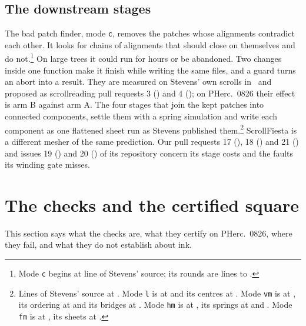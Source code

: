 \subsection{The downstream stages}

The bad patch finder, mode \texttt{c}, removes the patches whose alignments contradict each other. It looks for chains
of alignments that should close on themselves and do not.\footnote{Mode \texttt{c} begins at line \LineC{} of Stevens'
source; its rounds are lines \LineCRoundTwo{} to \LineCRoundFive{}.} On large trees it could run for hours or be
abandoned. Two changes inside one function make it finish while writing the same files, and a guard turns an abort into
a result. They are measured on Stevens' own scrolls in~\cite{workS} and proposed as scrollreading pull requests 3
(\UpSrThreeState{}) and 4 (\UpSrFourState{}); on PHerc.~0826 their effect is arm B against arm A. The four stages that
join the kept patches into connected components, settle them with a spring simulation and write each component as one
flattened sheet run as Stevens published them.\footnote{Lines of Stevens' source at \SrCommit{}. Mode \texttt{l} is at
\LineL{} and its centres at \LineLCentre{}. Mode \texttt{vm} is at \LineVm{}, its ordering at \LineVmOrders{} and its
bridges at \LineVmBridges{}. Mode \texttt{hm} is at \LineHm{}, its springs at \LineHmSprings{} and \LineHmRun{}. Mode
\texttt{fm} is at \LineFm{}, its sheets at \LineFmScore{}.} ScrollFiesta is a different mesher of the same prediction.
Our pull requests 17 (\UpSfSeventeenState{}), 18 (\UpSfEighteenState{}) and 21 (\UpSfTwentyOneState{}) and issues 19
(\UpSfNineteenState{}) and 20 (\UpSfTwentyState{}) of its repository concern its stage costs and the faults its winding
gate misses.

\section{The checks and the certified square}
\label{sec:checks}

This section says what the checks are, what they certify on PHerc.~0826, where they fail, and what they do not
establish about ink.


